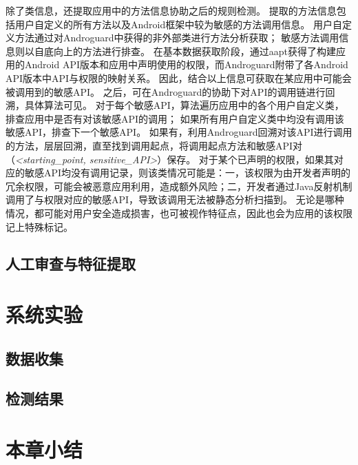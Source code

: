 除了类信息，\componentB 还提取应用中的方法信息协助之后的规则检测。
提取的方法信息包括用户自定义的所有方法以及Android框架中较为敏感的方法调用信息。
用户自定义方法通过对Androguard中获得的非外部类进行方法分析获取；
敏感方法调用信息则以自底向上的方法进行排查。
在基本数据获取阶段，\componentB 通过aapt获得了构建应用的Android API版本和应用中声明使用的权限，而Androguard附带了各Android API版本中API与权限的映射关系。
因此，结合以上信息可获取在某应用中可能会被调用到的敏感API。
之后，可在Androguard的协助下对API的调用链进行回溯，具体算法可见。
对于每个敏感API，算法遍历应用中的各个用户自定义类，排查应用中是否有对该敏感API的调用；
如果所有用户自定义类中均没有调用该敏感API，排查下一个敏感API。
如果有，利用Androguard回溯对该API进行调用的方法，层层回溯，直至找到调用起点，将调用起点方法和敏感API对（\textit{<starting\_point, sensitive\_API>}）保存。
对于某个已声明的权限，如果其对应的敏感API均没有调用记录，则该类情况可能是：一，该权限为由开发者声明的冗余权限，可能会被恶意应用利用，造成额外风险；二，开发者通过Java反射机制调用了与权限对应的敏感API，导致该调用无法被静态分析扫描到。
无论是哪种情况，都可能对用户安全造成损害，也可被视作特征点，因此\componentB 也会为应用的该权限记上特殊标记。

\subsection{\componentC }


\subsection{人工审查与特征提取}
\section{系统实验}
\subsection{数据收集}
\subsection{检测结果}
\section{本章小结}
